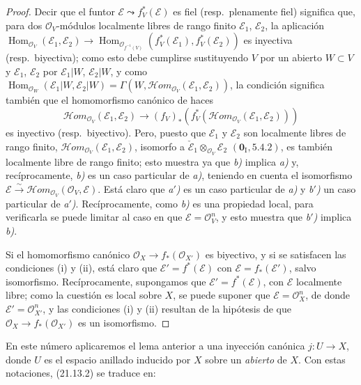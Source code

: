 \begin{proof}
Decir que el funtor $\mathscr E\leadsto f_V^*(\mathscr E)$ es fiel
(resp.\ plenamente fiel) significa que, para dos $\mathcal O_V$-módulos localmente
libres de rango finito $\mathscr E_1$, $\mathscr E_2$, la aplicación
$\operatorname{Hom}_{\mathcal O_V}(\mathscr E_1,\mathscr E_2)
\longrightarrow
\operatorname{Hom}_{\mathcal O_{f^{-1}(V)}}
(f_V^*(\mathscr E_1),f_V^*(\mathscr E_2))$
es inyectiva (resp.\ biyectiva); como esto debe cumplirse sustituyendo $V$ por un
abierto $W\subset V$ y $\mathscr E_1$, $\mathscr E_2$ por $\mathscr E_1|W$,
$\mathscr E_2|W$, y como
$\operatorname{Hom}_{\mathcal O_W}(\mathscr E_1|W,\mathscr E_2|W)
=\Gamma(W,\mathscr Hom_{\mathcal O_V}(\mathscr E_1,\mathscr E_2))$,
la condición significa también que el homomorfismo canónico de haces
\[
\label{IV.21.13.2.1}
  \mathscr Hom_{\mathcal O_V}(\mathscr E_1,\mathscr E_2)
  \longrightarrow
  (f_V)_*(f_V^*(\mathscr Hom_{\mathcal O_V}(\mathscr E_1,\mathscr E_2)))
  \tag{21.13.2.1}
\]
es inyectivo (resp.\ biyectivo). Pero, puesto que $\mathscr E_1$ y $\mathscr E_2$ son
localmente libres de rango finito,
$\mathscr Hom_{\mathcal O_V}(\mathscr E_1,\mathscr E_2)$, isomorfo a
$\check{\mathscr E}_1\otimes_{\mathcal O_V}\mathscr E_2$
$(\mathbf 0_{\mathrm I}, 5.4.2)$, es también localmente libre de rango finito; esto muestra
ya que \emph{b)} implica \emph{a)} y, recíprocamente, \emph{b)} es un caso particular de \emph{a)},
teniendo en cuenta el isomorfismo
$\mathscr E\xrightarrow{\sim}\mathscr Hom_{\mathcal O_V}(\mathcal O_V,\mathscr E)$.
Está claro que \emph{a$'$)} es un caso particular de \emph{a)} y \emph{b$'$)} un caso particular de
\emph{a$'$)}. Recíprocamente, como \emph{b)} es una propiedad local, para verificarla se puede
limitar al caso en que $\mathscr E=\mathcal O_V^n$, y esto muestra que \emph{b$'$)} implica
\emph{b)}.

Si el homomorfismo canónico $\mathcal O_X\to f_*(\mathcal O_{X'})$ es biyectivo,
y si se satisfacen las condiciones (i) y (ii), está claro que
$\mathscr E'=f^*(\mathscr E)$ con $\mathscr E=f_*(\mathscr E')$, salvo isomorfismo.
Recíprocamente, supongamos que $\mathscr E'=f^*(\mathscr E)$, con $\mathscr E$ localmente
libre; como la cuestión es local sobre $X$, se puede suponer que
$\mathscr E=\mathcal O_X^n$, de donde $\mathscr E'=\mathcal O_{X'}^n$, y las condiciones
(i) y (ii) resultan de la hipótesis de que
$\mathcal O_X\to f_*(\mathcal O_{X'})$ es un isomorfismo.
\end{proof}

En este número aplicaremos el lema anterior a una inyección canónica
$j:U\to X$, donde $U$ es el espacio anillado inducido por $X$ sobre un \emph{abierto} de $X$.
Con estas notaciones, (21.13.2) se traduce en:

